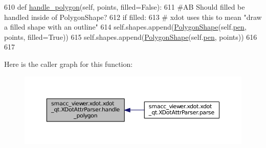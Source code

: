 \begin{DoxyCode}
610     \textcolor{keyword}{def }\hyperlink{classsmacc__viewer_1_1xdot_1_1xdot__qt_1_1XDotAttrParser_a2796cbaf4ffc2475cc615aa3cfd24126}{handle\_polygon}(self, points, filled=False):
611         \textcolor{comment}{#AB Should filled be handled inside of PolygonShape?}
612         \textcolor{keywordflow}{if} filled:
613             \textcolor{comment}{# xdot uses this to mean "draw a filled shape with an outline"}
614             self.shapes.append(\hyperlink{classsmacc__viewer_1_1xdot_1_1xdot__qt_1_1PolygonShape}{PolygonShape}(self.\hyperlink{classsmacc__viewer_1_1xdot_1_1xdot__qt_1_1XDotAttrParser_a22ec4e08bbdb0ba31a8b5e09db560d8c}{pen}, points, filled=\textcolor{keyword}{True}))
615         self.shapes.append(\hyperlink{classsmacc__viewer_1_1xdot_1_1xdot__qt_1_1PolygonShape}{PolygonShape}(self.\hyperlink{classsmacc__viewer_1_1xdot_1_1xdot__qt_1_1XDotAttrParser_a22ec4e08bbdb0ba31a8b5e09db560d8c}{pen}, points))
616 
617 
\end{DoxyCode}


Here is the caller graph for this function\+:
\nopagebreak
\begin{figure}[H]
\begin{center}
\leavevmode
\includegraphics[width=350pt]{classsmacc__viewer_1_1xdot_1_1xdot__qt_1_1XDotAttrParser_a2796cbaf4ffc2475cc615aa3cfd24126_icgraph}
\end{center}
\end{figure}


